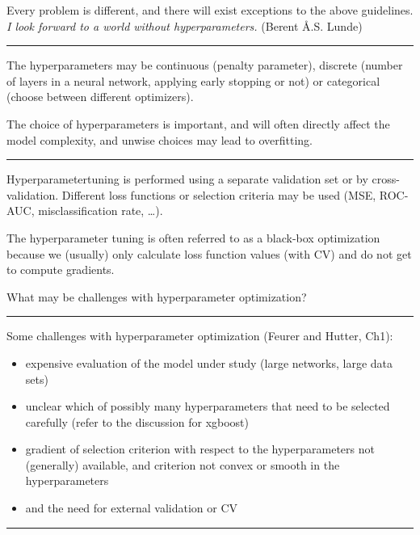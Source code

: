 \documentclass[
  letterpaper,
  DIV=11,
  numbers=noendperiod]{scrartcl}
\providecommand{\tightlist}{%
  \setlength{\itemsep}{0pt}\setlength{\parskip}{0pt}}\usepackage{longtable,booktabs,array}
\begin{document}
Every problem is different, and there will exist exceptions to the above
guidelines. \emph{I look forward to a world without hyperparameters.}
(Berent Å.S. Lunde)

\begin{center}\rule{0.5\linewidth}{0.5pt}\end{center}

The hyperparameters may be continuous (penalty parameter), discrete
(number of layers in a neural network, applying early stopping or not)
or categorical (choose between different optimizers).

The choice of hyperparameters is important, and will often directly
affect the model complexity, and unwise choices may lead to overfitting.

\begin{center}\rule{0.5\linewidth}{0.5pt}\end{center}

Hyperparametertuning is performed using a separate validation set or by
cross-validation. Different loss functions or selection criteria may be
used (MSE, ROC-AUC, misclassification rate, \ldots).

The hyperparameter tuning is often referred to as a black-box
optimization because we (usually) only calculate loss function values
(with CV) and do not get to compute gradients.

What may be challenges with hyperparameter optimization?

\begin{center}\rule{0.5\linewidth}{0.5pt}\end{center}

Some challenges with hyperparameter optimization (Feurer and Hutter,
Ch1):

\begin{itemize}
\tightlist
\item
  expensive evaluation of the model under study (large networks, large
  data sets)
\item
  unclear which of possibly many hyperparameters that need to be
  selected carefully (refer to the discussion for xgboost)
\item
  gradient of selection criterion with respect to the hyperparameters
  not (generally) available, and criterion not convex or smooth in the
  hyperparameters
\item
  and the need for external validation or CV
\end{itemize}

\begin{center}\rule{0.5\linewidth}{0.5pt}\end{center}
\end{document}
